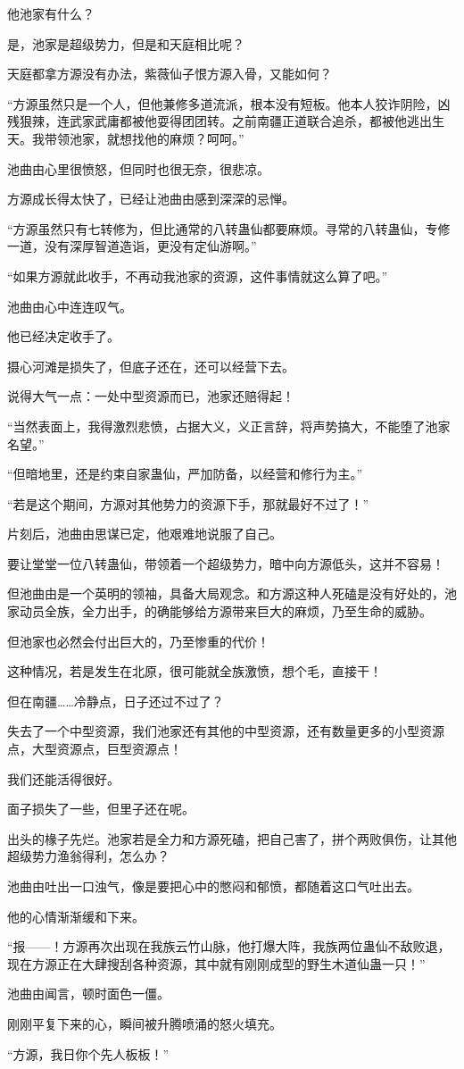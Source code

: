 \begin{this_body}
他池家有什么？

是，池家是超级势力，但是和天庭相比呢？

天庭都拿方源没有办法，紫薇仙子恨方源入骨，又能如何？

“方源虽然只是一个人，但他兼修多道流派，根本没有短板。他本人狡诈阴险，凶残狠辣，连武家武庸都被他耍得团团转。之前南疆正道联合追杀，都被他逃出生天。我带领池家，就想找他的麻烦？呵呵。”

池曲由心里很愤怒，但同时也很无奈，很悲凉。

方源成长得太快了，已经让池曲由感到深深的忌惮。

“方源虽然只有七转修为，但比通常的八转蛊仙都要麻烦。寻常的八转蛊仙，专修一道，没有深厚智道造诣，更没有定仙游啊。”

“如果方源就此收手，不再动我池家的资源，这件事情就这么算了吧。”

池曲由心中连连叹气。

他已经决定收手了。

摄心河滩是损失了，但底子还在，还可以经营下去。

说得大气一点：一处中型资源而已，池家还赔得起！

“当然表面上，我得激烈悲愤，占据大义，义正言辞，将声势搞大，不能堕了池家名望。”

“但暗地里，还是约束自家蛊仙，严加防备，以经营和修行为主。”

“若是这个期间，方源对其他势力的资源下手，那就最好不过了！”

片刻后，池曲由思谋已定，他艰难地说服了自己。

要让堂堂一位八转蛊仙，带领着一个超级势力，暗中向方源低头，这并不容易！

但池曲由是一个英明的领袖，具备大局观念。和方源这种人死磕是没有好处的，池家动员全族，全力出手，的确能够给方源带来巨大的麻烦，乃至生命的威胁。

但池家也必然会付出巨大的，乃至惨重的代价！

这种情况，若是发生在北原，很可能就全族激愤，想个毛，直接干！

但在南疆……冷静点，日子还过不过了？

失去了一个中型资源，我们池家还有其他的中型资源，还有数量更多的小型资源点，大型资源点，巨型资源点！

我们还能活得很好。

面子损失了一些，但里子还在呢。

出头的椽子先烂。池家若是全力和方源死磕，把自己害了，拼个两败俱伤，让其他超级势力渔翁得利，怎么办？

池曲由吐出一口浊气，像是要把心中的憋闷和郁愤，都随着这口气吐出去。

他的心情渐渐缓和下来。

“报——！方源再次出现在我族云竹山脉，他打爆大阵，我族两位蛊仙不敌败退，现在方源正在大肆搜刮各种资源，其中就有刚刚成型的野生木道仙蛊一只！”

池曲由闻言，顿时面色一僵。

刚刚平复下来的心，瞬间被升腾喷涌的怒火填充。

“方源，我日你个先人板板！”

\end{this_body}


